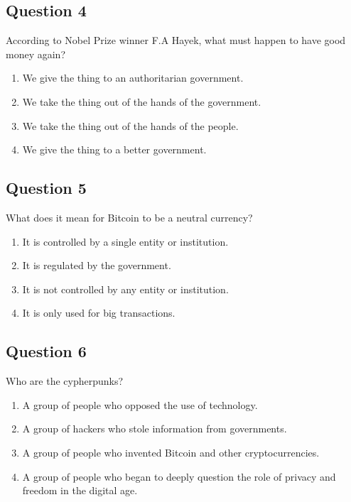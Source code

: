 \documentclass[12pt,a4paper]{article}
\begin{document}
\bigskip


\subsection*{Question 4}
According to Nobel Prize winner F.A Hayek, what must happen to have good money again?

\begin{enumerate}[label=\Alph*., leftmargin=*]
\item We give the thing to an authoritarian government.
\item We take the thing out of the hands of the government.
\item We take the thing out of the hands of the people.
\item We give the thing to a better government.
\end{enumerate}

\bigskip


\subsection*{Question 5}
What does it mean for Bitcoin to be a neutral currency?

\begin{enumerate}[label=\Alph*., leftmargin=*]
\item It is controlled by a single entity or institution.
\item It is regulated by the government.
\item It is not controlled by any entity or institution.
\item It is only used for big transactions.
\end{enumerate}

\bigskip


\subsection*{Question 6}
Who are the cypherpunks?

\begin{enumerate}[label=\Alph*., leftmargin=*]
\item A group of people who opposed the use of technology.
\item A group of hackers who stole information from governments.
\item A group of people who invented Bitcoin and other cryptocurrencies.
\item A group of people who began to deeply question the role of privacy and freedom in the digital age.
\end{enumerate}
\end{document}
